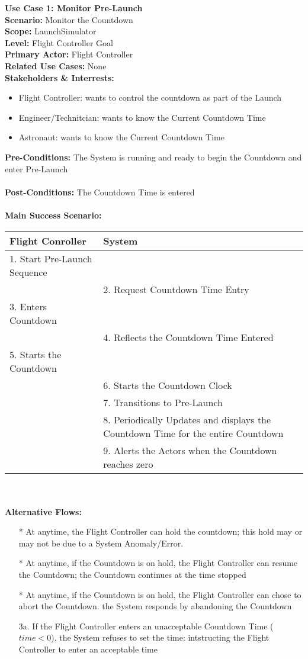 \documentclass[letterpaper]{article}
\begin{document}
\noindent
\textbf{Use Case 1:  Monitor Pre-Launch}\\
\textbf{Scenario:  }Monitor the Countdown\\
\textbf{Scope:  }LaunchSimulator\\
\textbf{Level:  }Flight Controller Goal\\
\textbf{Primary Actor:  }Flight Controller\\
\textbf{Related Use Cases:  }None\\
\textbf{Stakeholders \& Interrests:  }
\begin{itemize}
\item Flight Controller: wants to control the countdown as part of
 the Launch
\item  Engineer/Technitcian:  wants to know the Current Countdown Time
\item Astronaut:  wants to know the Current Countdown Time
\end{itemize}
\textbf{Pre-Conditions:  }The System is running and ready to begin
the Countdown and enter Pre-Launch\\\\
\textbf{Post-Conditions:  }The Countdown Time is entered\\\\
\textbf{Main Success Scenario:  }\\
\begin{tabular}{|p{5.75cm}|p{5.75cm}|}\hline
\textbf{Flight Conroller} & \textbf{System}\\\hline
1.  Start Pre-Launch Sequence &\\\hline
& 2.  Request Countdown Time Entry\\\hline
3.  Enters Countdown &\\\hline
& 4.  Reflects the Countdown Time Entered\\\hline
5.  Starts the Countdown &\\\hline
& 6. Starts the Countdown Clock\\\hline
& 7. Transitions to Pre-Launch\\\hline
& 8.  Periodically Updates  and displays the Countdown Time for the
entire Countdown\\\hline
& 9.  Alerts the Actors when the Countdown reaches zero\\\hline
\end{tabular}\\\\
\textbf{Alternative Flows:  }
\begin{itemize}
\item[*]At anytime, the Flight Controller can hold the countdown; this
hold may or may not be due to a System Anomaly/Error.
\item[*]At anytime, if the Countdown is on hold, the Flight Controller
can resume the Countdown;  the Countdown continues at the time stopped
\item[*]At anytime, if the Countdown is on hold, the Flight Controller
can chose to abort the Countdown.  the System responds by abandoning
the Countdown
\item[3a.]  If the Flight Controller enters an unacceptable Countdown
Time ($time < 0$), the System refuses to set the time:  intstructing
the Flight Controller to enter an acceptable time
\end{itemize}
\end{document}

